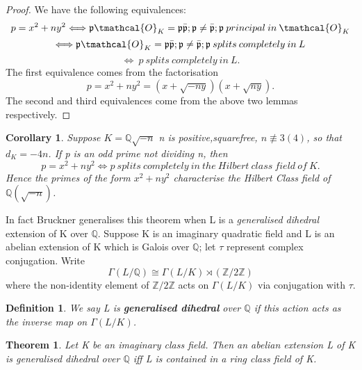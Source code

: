 \documentclass[preprint,12pt,reqno]{elsarticle}
\newtheorem{theorem}{Theorem}
\newtheorem{corollary}{Corollary}[theorem]
\newtheorem{definition}{Definition}
\begin{document}
\begin{proof}
We have the following equivalences:
\begin{equation}
    p=x^2+ny^2\Longleftrightarrow\mathfrak{p}\tmathcal{O}_K=\mathfrak{p}\bar{\mathfrak{p}}; \mathfrak{p}\neq\bar{\mathfrak{p}}; \mathfrak{p}\: principal\:in\: \tmathcal{O}_K
\end{equation}
\begin{equation}
    \Longleftrightarrow\mathfrak{p}\tmathcal{O}_K=\mathfrak{p}\bar{\mathfrak{p}}; \mathfrak{p}\neq\bar{\mathfrak{p}}; \mathfrak{p}\:splits\:completely\:in\:L
\end{equation}
\begin{equation}
    \Longleftrightarrow\:p\:splits\:completely\:in\:L.
\end{equation}
The first equivalence comes from the factorisation 
\begin{equation}
    p=x^2+ny^2=(x+\sqrt{-ny})(x+\sqrt{ny}).
\end{equation}
The second and third equivalences come from the above two lemmas respectively.
\end{proof}
\begin{corollary}
Suppose $K=\mathbb{Q}{\sqrt{-n}}$ n is positive,squarefree, $n\not\equiv 3(4)$, so that $d_K=-4n$. If p is an odd prime not dividing n, then
\begin{equation} p=x^2+ny^2 \Longleftrightarrow p\:splits\:completely\:in\:the\:Hilbert\:class\:field\:of\:K.
\end{equation}
Hence the primes of the form $x^2+ny^2$ characterise the Hilbert Class field of $\mathbb{Q}(\sqrt{-n})$.
\end{corollary}
In fact Bruckner \cite{BRUC} generalises this theorem when L is a \textit{generalised dihedral} extension of K over $\mathbb{Q}$. Suppose K is an imaginary quadratic field and L is an abelian extension of K which is Galois over $\mathbb{Q}$; let $\tau$ represent complex conjugation. Write
\begin{equation}
   \Gamma(L/\mathbb{Q})\cong \Gamma(L/K)\rtimes(\mathbb{Z}/2\mathbb{Z})
\end{equation}
where the non-identity element of $\mathbb{Z}/2\mathbb{Z}$ acts on $\Gamma(L/K)$ via conjugation with $\tau$.
\begin{definition}
 We say L is \textbf{generalised dihedral} over $\mathbb{Q}$ if this action acts as the inverse map on $\Gamma(L/K)$.
\end{definition}

\begin{theorem}
Let K be an imaginary class field. Then an abelian extension L of K is generalised dihedral over $\mathbb{Q}$ iff L is contained in a ring class field of K.
\end{theorem}
\end{document}
